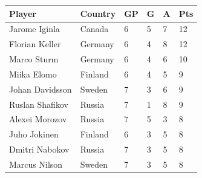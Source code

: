 \documentclass{article}
\begin{document}
\begin{tabular}{llllll}
\toprule
Player & Country & GP & G & A & Pts \\
\midrule
Jarome Iginla & Canada & 6 & 5 & 7 & 12 \\
Florian Keller & Germany & 6 & 4 & 8 & 12 \\
Marco Sturm & Germany & 6 & 4 & 6 & 10 \\
Miika Elomo & Finland & 6 & 4 & 5 & 9 \\
Johan Davidsson & Sweden & 7 & 3 & 6 & 9 \\
Ruslan Shafikov & Russia & 7 & 1 & 8 & 9 \\
Alexei Morozov & Russia & 7 & 5 & 3 & 8 \\
Juho Jokinen & Finland & 6 & 3 & 5 & 8 \\
Dmitri Nabokov & Russia & 7 & 3 & 5 & 8 \\
Marcus Nilson & Sweden & 7 & 3 & 5 & 8 \\
\bottomrule
\end{tabular}
\end{document}
